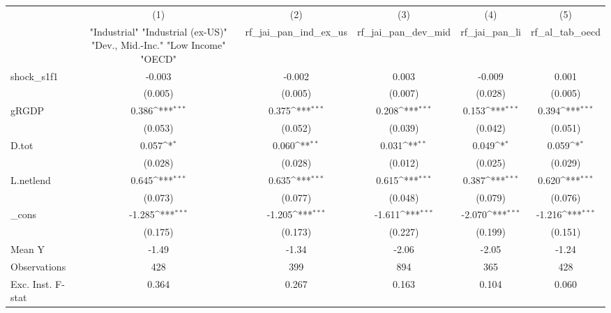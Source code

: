 {
\def\sym#1{\ifmmode^{#1}\else\(^{#1}\)\fi}
\begin{tabular}{l*{5}{c}}
\toprule
            &\multicolumn{1}{c}{(1)}&\multicolumn{1}{c}{(2)}&\multicolumn{1}{c}{(3)}&\multicolumn{1}{c}{(4)}&\multicolumn{1}{c}{(5)}\\
            &\multicolumn{1}{c}{ "Industrial" "Industrial (ex-US)" "Dev., Mid.-Inc." "Low Income" "OECD" }&\multicolumn{1}{c}{rf\_jai\_pan\_ind\_ex\_us}&\multicolumn{1}{c}{rf\_jai\_pan\_dev\_mid}&\multicolumn{1}{c}{rf\_jai\_pan\_li}&\multicolumn{1}{c}{rf\_al\_tab\_oecd}\\
\midrule
shock\_s1f1  &      -0.003         &      -0.002         &       0.003         &      -0.009         &       0.001         \\
            &     (0.005)         &     (0.005)         &     (0.007)         &     (0.028)         &     (0.005)         \\
\addlinespace
gRGDP       &       0.386\sym{***}&       0.375\sym{***}&       0.208\sym{***}&       0.153\sym{***}&       0.394\sym{***}\\
            &     (0.053)         &     (0.052)         &     (0.039)         &     (0.042)         &     (0.051)         \\
\addlinespace
D.tot       &       0.057\sym{*}  &       0.060\sym{**} &       0.031\sym{**} &       0.049\sym{*}  &       0.059\sym{*}  \\
            &     (0.028)         &     (0.028)         &     (0.012)         &     (0.025)         &     (0.029)         \\
\addlinespace
L.netlend   &       0.645\sym{***}&       0.635\sym{***}&       0.615\sym{***}&       0.387\sym{***}&       0.620\sym{***}\\
            &     (0.073)         &     (0.077)         &     (0.048)         &     (0.079)         &     (0.076)         \\
\addlinespace
\_cons      &      -1.285\sym{***}&      -1.205\sym{***}&      -1.611\sym{***}&      -2.070\sym{***}&      -1.216\sym{***}\\
            &     (0.175)         &     (0.173)         &     (0.227)         &     (0.199)         &     (0.151)         \\
\midrule
Mean Y      &       -1.49         &       -1.34         &       -2.06         &       -2.05         &       -1.24         \\
Observations&         428         &         399         &         894         &         365         &         428         \\
Exc. Inst. F-stat&       0.364         &       0.267         &       0.163         &       0.104         &       0.060         \\
\bottomrule
\end{tabular}
}

